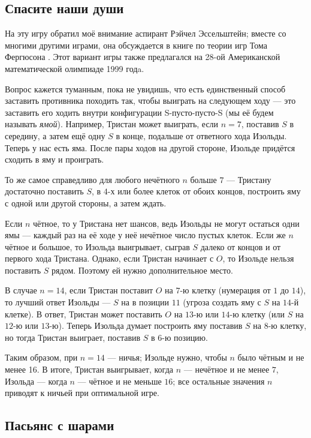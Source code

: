 \subsection*{Спасите наши души}

На эту игру обратил моё внимание аспирант Рэйчел Эссельштейн;
вместе со многими другими играми, она обсуждается в книге по теории игр Тома Фергюсона \cite{ferguson}.
Этот вариант игры также предлагался на 28-ой Американской математической олимпиаде 1999 годa.

Вопрос кажется туманным, пока не увидишь, что есть единственный способ заставить противника походить так, чтобы выиграть на следующем ходу --- это заставить его ходить внутри конфигурации S-пусто-пусто-S (мы её будем называть \emph{ямой}).
Например, Тристан может выиграть, если $n = 7$, поставив $S$ в середину, а затем ещё одну $S$ в конце, подальше от ответного хода Изольды.
Теперь у нас есть яма.
После пары ходов на другой стороне, Изольде придётся сходить в яму и проиграть.

То же самое справедливо для любого нечётного $n$ больше $7$ --- Тристану достаточно поставить $S$, в $4$-х или более клеток от обоих концов, построить яму с одной или другой стороны, а затем ждать.

Если $n$ чётное, то у Тристана нет шансов, ведь Изольды не могут остаться одни ямы --- каждый раз на её ходе у неё нечётное число пустых клеток.
Если же $n$ чётное и большое, то Изольда выигрывает, сыграв $S$ далеко от концов и от первого хода Тристана.
Однако, если Тристан начинает с $O$, то Изольде нельзя поставить $S$ рядом. 
Поэтому ей нужно дополнительное место.

В случае $n = 14$, если Тристан поставит $O$ на $7$-ю клетку (нумерация от $1$ до $14$), то лучший ответ Изольды --- $S$ на в позиции $11$ (угроза создать яму с $S$ на $14$-й клетке).
В ответ, Тристан может поставить $O$ на $13$-ю или $14$-ю клетку (или $S$ на $12$-ю или $13$-ю). 
Теперь Изольда думает построить яму поставив $S$ на $8$-ю клетку, но тогда Тристан выиграет, поставив $S$ в $6$-ю позицию.

Таким образом, при $n = 14$ --- ничья; Изольде нужно, чтобы $n$ было чётным и не менее 16. В итоге, Тристан выигрывает, когда $n$ --- нечётное и не менее $7$, Изольда --- когда $n$ --- чётное и не меньше $16$;
все остальные значения $n$ приводят к ничьей при оптимальной игре.

\subsection*{Пасьянс с шарами}

